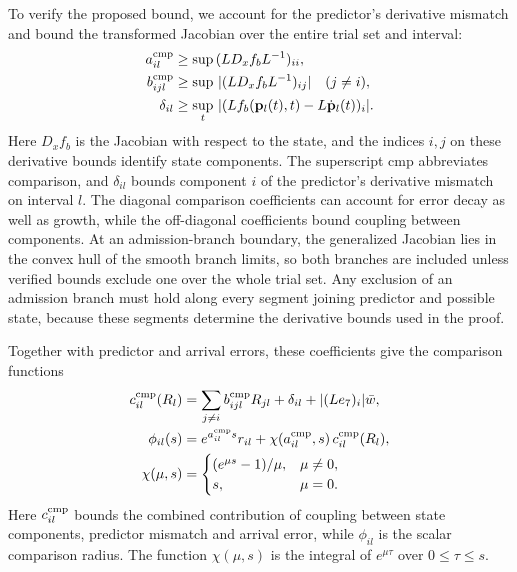 \documentclass[final]{cas-sc}
\theoremstyle{definition}
\theoremstyle{plain}
\theoremstyle{definition}
\theoremstyle{plain}
\begin{document}
To verify the proposed bound, we account for the predictor's derivative
mismatch and bound the transformed Jacobian over the entire trial set
and interval:
\begin{equation}
\begin{aligned}
a_{il}^{\rm cmp}&\ge\sup\,(LD_xf_bL^{-1})_{ii},\\
b_{ijl}^{\rm cmp}&\ge\sup\,|(LD_xf_bL^{-1})_{ij}|\quad(j\ne i),\\
\delta_{il}&\ge\sup_t\,|(Lf_b(\mathbf p_l(t),t)-L\dot{\mathbf p}_l(t))_i|.
\end{aligned}
\label{eq:new-local-bounds}
\end{equation}
Here $D_xf_b$ is the Jacobian with respect to the state, and the
indices $i,j$ on these derivative bounds identify state components.
The superscript cmp abbreviates comparison, and $\delta_{il}$ bounds
component $i$ of the predictor's derivative mismatch on interval $l$.
The diagonal comparison coefficients can account for error decay as
well as growth, while the off-diagonal coefficients bound coupling
between components. At an admission-branch boundary, the generalized
Jacobian lies in the convex hull of the smooth branch limits, so both
branches are included unless verified bounds exclude one over the
whole trial set. Any exclusion of an admission branch must hold along
every segment joining predictor and possible state, because these
segments determine the derivative bounds used in the proof.

Together with predictor and arrival errors, these coefficients give the
comparison functions
\begin{equation}
\begin{aligned}
c_{il}^{\rm cmp}(R_l)&=\sum_{j\ne i}b_{ijl}^{\rm cmp}R_{jl}
+\delta_{il}+|(Le_7)_i|\bar w,\\
\phi_{il}(s)&=e^{a_{il}^{\rm cmp}s}r_{il}
+\chi(a_{il}^{\rm cmp},s)\,c_{il}^{\rm cmp}(R_l),\\
\chi(\mu,s)&=\begin{cases}
(e^{\mu s}-1)/\mu,&\mu\ne0,\\
s,&\mu=0.
\end{cases}
\end{aligned}
\label{eq:new-component-comparison}
\end{equation}
Here $c_{il}^{\rm cmp}$ bounds the combined contribution of coupling
between state components, predictor mismatch and arrival error, while
$\phi_{il}$ is the scalar comparison radius. The function
$\chi(\mu,s)$ is the integral of $e^{\mu\tau}$ over $0\le\tau\le s$.
\end{document}
